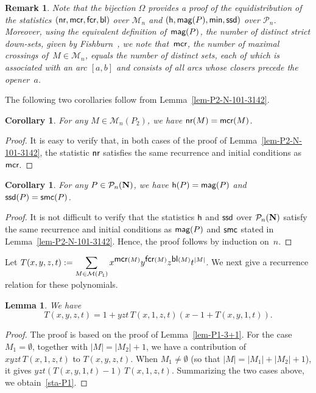 \documentclass[11pt]{article}
\DeclareMathOperator{\h}{\mbox{\sf{h}}}
\DeclareMathOperator{\nr}{\mbox{\sf{nr}}}
\DeclareMathOperator{\bl}{\mbox{\sf{bl}}}
\DeclareMathOperator{\mcr}{\mbox{\sf{mcr}}}
\DeclareMathOperator{\smc}{\mbox{\sf{smc}}}
\DeclareMathOperator{\magg}{\mbox{\sf{mag}}}
\DeclareMathOperator{\minn}{\mbox{\sf{min}}}
\DeclareMathOperator{\ssd}{\mbox{\sf{ssd}}}
\DeclareMathOperator{\fcr}{\mbox{\sf{fcr}}}
\newtheorem{lem}[thm]{Lemma}
\newtheorem{coro}[thm]{Corollary}
\newtheorem{remark}[thm]{Remark}
\newcommand{\PP}{{\mathcal P}}
\newcommand{\M}{\mathcal{M}}
\begin{document}
	\begin{remark}
		Note that the bijection $\Omega$ provides a proof of the equidistribution of the statistics 
		$(\nr, \mcr, \fcr, \bl)$ over $\M_n$ and $(\h, \magg(P), \minn, \ssd)$ over $\PP_n$.
		Moreover, using the equivalent definition of~$\magg(P)$, the number of distinct strict down-sets, given by Fishburn~\cite{Fishburn-1983,Fishburn-1985}, we note that~$\mcr$, the number of maximal crossings of~$M\in\M_n$, equals the number of distinct sets, each of which is associated with an arc $[a,b]$ and consists of all arcs whose closers precede the opener~$a$.
	\end{remark}
	
	The following two corollaries follow from Lemma~\ref{lem-P2-N-101-3142}.
	
	\begin{coro}\label{coro-coin-MP2}
		For any $M \in \M_n(P_2)$, we have $\nr(M)=\mcr(M)$.
	\end{coro}
	\begin{proof}
		It is easy to verify that, in both cases of the proof of Lemma~\ref{lem-P2-N-101-3142}, 
		the statistic $\nr$ satisfies the same recurrence and initial conditions as $\mcr$.
	\end{proof}
	
	\begin{coro}\label{coro-coin-P-N}
		For any $P \in \PP_n\bf{(N)}$, we have
		$
		\h(P)=\magg(P)$ and $\ssd(P)=\smc(P)$.
	\end{coro}
	\begin{proof}
		It is not difficult to verify that the statistics $\h$ and $\ssd$ over $\PP_n\bf{(N)}$ satisfy the same recurrence and initial conditions as $\magg(P)$ and $\smc$ stated in Lemma~\ref{lem-P2-N-101-3142}. Hence, the proof follows by induction on~$n$.
	\end{proof}
	
	Let $T(x,y,z,t):=\displaystyle\sum_{M \in \M(P_1)} x^{{\mcr(M)}}y^{{\fcr(M)}} z^{{\bl(M)}}t^{|M|}$. 
	We next give a recurrence relation for these polynomials.
	
	\begin{lem}\label{lem-sta-P1}
		We have
		\begin{equation}\label{sta-P1}
			T(x,y,z,t)= 1+yzt\, T(x,1,z,t) \left(x-1+T(x,y,1,t)\right).
		\end{equation}
	\end{lem}
	\begin{proof}
		The proof is based on the proof of Lemma~\ref{lem-P1-3+1}. 
		For the case $M_1=\emptyset$, together with $|M|=|M_2|+1$, we have a contribution of $xyzt\, T(x,1,z,t)$ to $T(x,y,z,t)$. When $M_1 \neq \emptyset$ (so that $|M|=|M_1|+|M_2|+1$), it gives $yzt \left(T(x,y,1,t)-1 \right)\, T(x,1,z,t)$.
		Summarizing the two cases above, we obtain~\eqref{sta-P1}.
	\end{proof}
	
\end{document}
